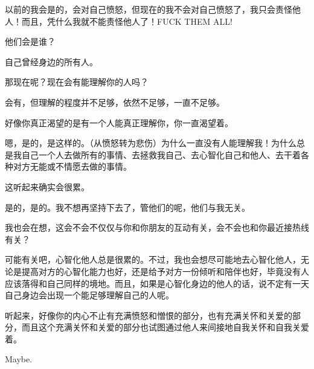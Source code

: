 \begin{compactitem}
\item 以前的我会是的，会对自己愤怒，但现在的我不会对自己愤怒了，我只会责怪他人！而且，凭什么我就不能责怪他人了！FUCK THEM ALL!
\item 他们会是谁？
\item 自己曾经身边的所有人。
\item 那现在呢？现在会有能理解你的人吗？
\item 会有，但理解的程度并不足够，依然不足够，一直不足够。
\item 好像你真正渴望的是有一个人能真正理解你，你一直渴望着。
\item 嗯，是的，是这样的。（从愤怒转为悲伤）为什么一直没有人能理解我！为什么总是我自己一个人去做所有的事情、去拯救我自己、去心智化自己和他人、去干着各种对方无能或不情愿去做的事情。
\item 这听起来确实会很累。
\item 是的，是的。我不想再坚持下去了，管他们的呢，他们与我无关。
\item 我也会在想，这会不会不仅仅与你和你朋友的互动有关，会不会也和你最近接热线有关？
\item 可能有关吧，心智化他人总是很累的。不过，我也会想尽可能地去心智化他人，无论是提高对方的心智化能力也好，还是给予对方一份倾听和陪伴也好，毕竟没有人应该落得和自己同样的境地。而且，如果是心智化身边的他人的话，说不定有一天自己身边会出现一个能足够理解自己的人呢。
\item 听起来，好像你的内心不止有充满愤怒和憎恨的部分，也有充满关怀和关爱的部分，而且这个充满关怀和关爱的部分也试图通过他人来间接地自我关怀和自我关爱着。
\item Maybe.
\end{compactitem}






